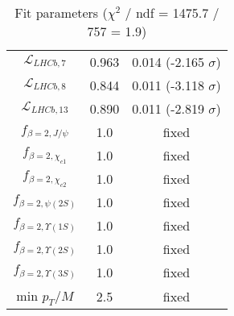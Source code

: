 \begin{table}[h!]
\begin{tabular}{c|c|c}
$\mathcal L_{LHCb,7}$ & 0.963 & 0.014 (-2.165 $\sigma$) \\
$\mathcal L_{LHCb,8}$ & 0.844 & 0.011 (-3.118 $\sigma$) \\
$\mathcal L_{LHCb,13}$ & 0.890 & 0.011 (-2.819 $\sigma$) \\
$f_{\beta=2,J/\psi}$ & 1.0 & fixed \\
$f_{\beta=2,\chi_{c1}}$ & 1.0 & fixed \\
$f_{\beta=2,\chi_{c2}}$ & 1.0 & fixed \\
$f_{\beta=2,\psi(2S)}$ & 1.0 & fixed \\
$f_{\beta=2,\Upsilon(1S)}$ & 1.0 & fixed \\
$f_{\beta=2,\Upsilon(2S)}$ & 1.0 & fixed \\
$f_{\beta=2,\Upsilon(3S)}$ & 1.0 & fixed \\
min $p_T/M$ & 2.5 & fixed \\
\end{tabular}
\caption{Fit parameters ($\chi^2$ / ndf = 1475.7 / 757 = 1.9)}
\end{table}
